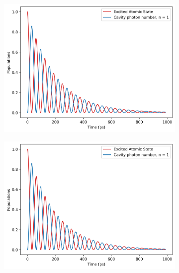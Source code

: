 \documentclass[11pt]{article}
\begin{document}
\begin{figure}[H]
    \centering
    \begin{subfigure}{0.45\textwidth} 
        \centering
        \includegraphics[width=\linewidth]{Research Project/Code/results/JCM/OQS_Pop_Spont.png}
        \caption{}
        \label{fig:JCM_OQS_Pop_Spont}
    \end{subfigure}
    \hfill
    \begin{subfigure}{0.45\textwidth}
        \centering
        \includegraphics[width=\linewidth]{Research Project/Code/results/JCM/OQS_Pop_Therm.png}
        \caption{}
         \label{fig:JCM_OQS_Pop_Therm}
    \end{subfigure}
    

\end{figure}
\end{document}

